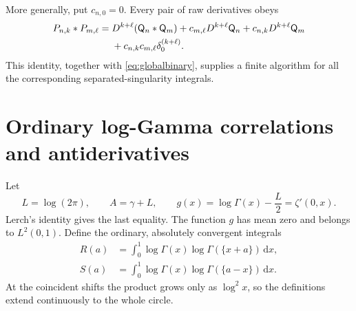 \documentclass[11pt]{article}
\numberwithin{equation}{section}
\theoremstyle{definition}\newtheorem{definition}[theorem]{Definition}
\theoremstyle{remark}\newtheorem{remark}[theorem]{Remark}
\newcommand{\dd}{\,\mathrm d}
\newcommand{\qn}[1]{\mathsf Q_{#1}}
\begin{document}
More generally, put $c_{n,0}=0$. Every pair of raw derivatives obeys
\begin{align}\label{eq:twoderivatives}
 P_{n,k}*P_{m,\ell}={}&D^{k+\ell}(\qn n*\qn m)
     +c_{m,\ell}D^{k+\ell}\qn n+c_{n,k}D^{k+\ell}\qn m\notag\\
     &+c_{n,k}c_{m,\ell}\delta_0^{(k+\ell)}.
\end{align}
This identity, together with \eqref{eq:globalbinary}, supplies a finite
algorithm for all the corresponding separated-singularity integrals.

\section{Ordinary log-Gamma correlations and antiderivatives}
\label{sec:loggamma}

Let
\begin{equation}\label{eq:ALg}
 L=\log(2\pi),\qquad A=\gamma+L,\qquad
 g(x)=\log\Gamma(x)-\frac L2=\zeta'(0,x).
\end{equation}
Lerch's identity gives the last equality. The function $g$ has mean zero
and belongs to $L^2(0,1)$. Define the ordinary, absolutely convergent
integrals
\begin{align}
 R(a)&=\int_0^1\log\Gamma(x)\log\Gamma(\{x+a\})\dd x,
          \label{eq:Rloggamma}\\
 S(a)&=\int_0^1\log\Gamma(x)\log\Gamma(\{a-x\})\dd x.
          \label{eq:Sloggamma}
\end{align}
At the coincident shifts the product grows only as $\log^2 x$, so the
definitions extend continuously to the whole circle.
\end{document}
